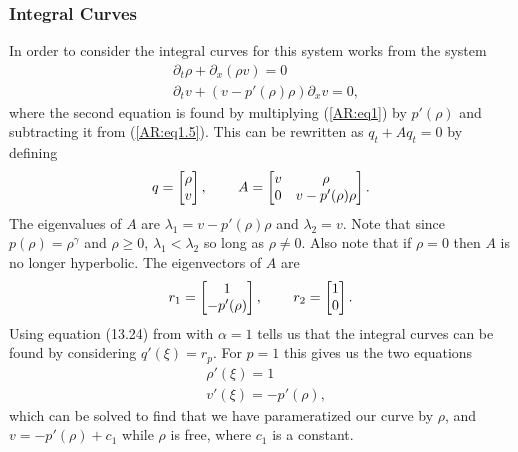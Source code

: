 \documentclass{article}
\begin{document}
\subsubsection{Integral Curves}
In order to consider the integral curves for this system \cite{AwRascle2000} 
works from the system
\begin{align*}
&\partial_t \rho + \partial_x (\rho v) = 0 \\ 
&\partial_t v + \left(v - p'(\rho)\rho\right)\partial_x v = 0,
\end{align*}
where the second equation is found by multiplying (\ref{AR:eq1}) 
by $p'(\rho)$ and subtracting it from (\ref{AR:eq1.5}). 
This can be rewritten as $q_t + Aq_t = 0$ by defining
\begin{align*}
q = \left[ \begin{matrix}
\rho \\ v
\end{matrix}\right] , \hspace{0.3in}
A = \left[ \begin{matrix}
v & \rho \\
0 & v - p'(\rho ) \rho
\end{matrix}\right].
\end{align*}
The eigenvalues of $A$ are $\lambda_1 = v - p'(\rho ) \rho$ and 
$\lambda_2 = v$. Note that since $p(\rho ) = \rho^{\gamma}$ 
and $\rho \geq 0$, $\lambda_1 < \lambda_2$ so long as $\rho \neq 0$. 
Also note that if $\rho = 0$ then $A$ is no longer 
hyperbolic. The eigenvectors of $A$ are
\begin{align*}
r_1 = \left[ \begin{matrix}
1 \\ - p'(\rho )
\end{matrix}\right], \hspace{0.3in}
r_2 = \left[ \begin{matrix}
1 \\ 0
\end{matrix}\right].
\end{align*}
Using equation (13.24) from \cite{LeVeque2002} with $\alpha = 1$ tells us 
that the integral curves can be found by considering $q'(\xi ) = r_p$. 
For $p = 1$ this gives us the two equations
\begin{align*}
&\rho'(\xi ) = 1 \\
&v'(\xi ) = - p'(\rho ),
\end{align*}
which can be solved to find that we have parameratized our curve by $\rho$, 
and $v = - p'(\rho ) + c_1$ while $\rho$ is free, where $c_1$ is a constant. 
\end{document}
